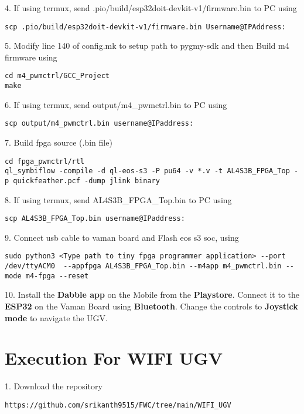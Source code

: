 \documentclass[journal,15pt,twocolumn,tikz, border=5mm]{IEEEtran}
\begin{document}
4. If using termux, send .pio/build/esp32doit-devkit-v1/firmware.bin to PC using
\begin{lstlisting}
scp .pio/build/esp32doit-devkit-v1/firmware.bin Username@IPAddress:
\end{lstlisting} 

5.  Modify line 140 of config.mk to setup path to pygmy-sdk and then Build m4 firmware using
\begin{lstlisting}
cd m4_pwmctrl/GCC_Project
make
\end{lstlisting}

6. If using termux, send output/m4{\_}pwmctrl.bin to PC using
\begin{lstlisting}
scp output/m4_pwmctrl.bin username@IPaddress:
\end{lstlisting} 

7. Build fpga source (.bin file)
\begin{lstlisting}
cd fpga_pwmctrl/rtl
ql_symbiflow -compile -d ql-eos-s3 -P pu64 -v *.v -t AL4S3B_FPGA_Top -p quickfeather.pcf -dump jlink binary 
\end{lstlisting} 

8. If using termux, send AL4S3B{\_}FPGA{\_}Top.bin to PC using
\begin{lstlisting}
scp AL4S3B_FPGA_Top.bin username@IPaddress:
\end{lstlisting} 

9. Connect usb cable to vaman board and Flash eos s3 soc, using
\begin{lstlisting}
sudo python3 <Type path to tiny fpga programmer application> --port /dev/ttyACM0  --appfpga AL4S3B_FPGA_Top.bin --m4app m4_pwmctrl.bin --mode m4-fpga --reset

\end{lstlisting} 

10. Install the \textbf{Dabble app} on the Mobile from the \textbf{Playstore}. Connect it to the \textbf{ESP32} on the Vaman Board using \textbf{Bluetooth}. Change the controls to \textbf{Joystick mode} to navigate the UGV.\\

\section{Execution For WIFI UGV}
\raggedright
1. Download the repository
\begin{lstlisting}
https://github.com/srikanth9515/FWC/tree/main/WIFI_UGV
\end{lstlisting}
\end{document}
